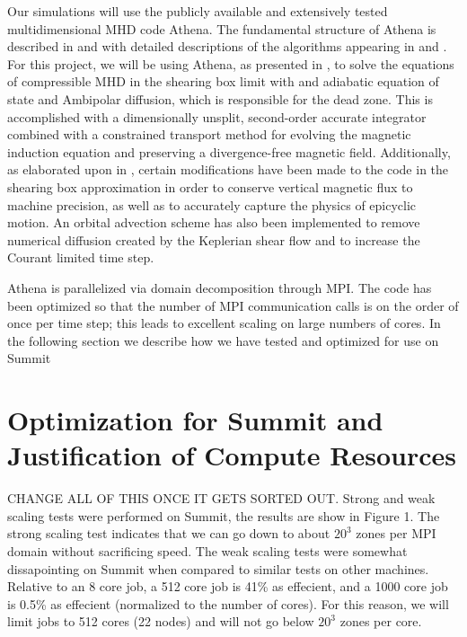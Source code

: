 \documentclass[preprint]{aastex}
\begin{document}
Our simulations will use the publicly available and extensively tested multidimensional MHD code {\sc Athena}.  The fundamental structure of {\sc Athena} is described in \citet{gardiner05a} and \citet{gardiner08} with detailed descriptions of the algorithms appearing in \citet{stone08} and \cite{stone10}.
For this project, we will be using {\sc Athena}, as presented in \citet{stone10}, to solve the equations of compressible MHD in the shearing box limit with and adiabatic equation of state and Ambipolar diffusion, which is responsible for the dead zone. 
This is accomplished with a dimensionally unsplit, second-order accurate integrator combined with a constrained transport method for evolving the magnetic induction equation and preserving a divergence-free magnetic field. 
Additionally, as elaborated upon in \citet{stone10}, certain modifications have been made to the code in the shearing box approximation in order to conserve vertical magnetic flux to machine precision, as well as to accurately capture the physics of epicyclic motion.  An orbital advection scheme has also been implemented to remove numerical diffusion created by the Keplerian shear flow and to increase the Courant limited time step.

{\sc Athena} is parallelized via domain decomposition through MPI.  The code has been optimized so that the number of MPI communication calls is on the order of once per time step; this leads to excellent scaling on large numbers of cores.  In the following section we describe how we have tested and optimized for use on {\sc Summit}



\vspace{-8mm}
\section{Optimization for Summit and Justification of Compute Resources}
\vspace{-2mm}

CHANGE ALL OF THIS ONCE IT GETS SORTED OUT.  Strong and weak scaling tests were performed on {\sc Summit}, the results are show in Figure 1.  The strong scaling test indicates that we can go down to about $20^3$ zones per MPI domain without sacrificing speed. The weak scaling tests were somewhat dissapointing on {\sc Summit} when compared to similar tests on other machines.  Relative to an 8 core job, a 512 core job is 41\% as effecient, and a 1000 core job is 0.5\% as effecient (normalized to the number of cores).  For this reason, we will limit jobs to 512 cores (22 nodes) and will not go below $20^3$ zones per core.  
\end{document}
